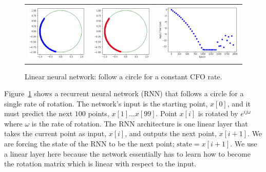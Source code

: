 \setlength{\tabcolsep}{0pt}
\begin{figure}
  \centering
  \caption{Linear neural network: follow a circle for a constant CFO rate.}
  \begin{tabular}{ccc}
    \includegraphics[width=50mm]{figures/cfo/follow_circle_linear_before.png}&
    \includegraphics[width=50mm]{figures/cfo/follow_circle_linear_after.png}&
    \includegraphics[width=70mm]{figures/cfo/follow_circle_linear_loss.png}\\
  \end{tabular}
  \label{fig:circle_constant_rate}
\end{figure}

Figure~\ref{fig:circle_constant_rate} shows a recurrent neural network (RNN) that follows a circle for a single rate of rotation.  The network's input is the starting point, $x[0]$, and it must predict the next $100$ points, $x[1] \ldots x[99]$.  Point $x[i]$ is rotated by $e^{ij\omega}$ where $\omega$ is the rate of rotation.  The RNN architecture is one linear layer that takes the current point as input, $x[i]$, and outputs the next point, $x[i+1]$.  We are forcing the state of the RNN to be the next point; $\text{state} = x[i+1]$.  We use a linear layer here because the network essentially has to learn how to become the rotation matrix which is linear with respect to the input. 

